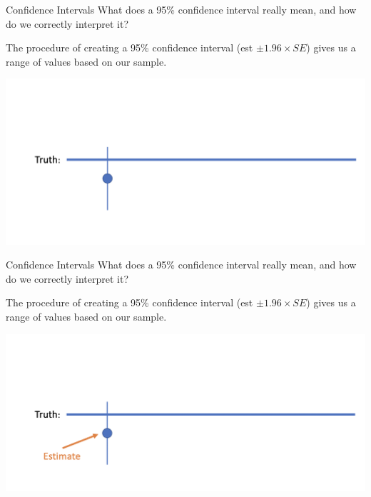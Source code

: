 \documentclass[10pt,t]{beamer}
\begin{document}
\begin{frame}{Confidence Intervals}
What does a 95\% confidence interval really mean, and how do we correctly interpret it?

\vspace{0.3cm}

The procedure of creating a 95\% confidence interval (est $\pm 1.96 \times SE$) gives us a range of values based on our sample.

\centering \includegraphics[scale=0.4]{ci1.png}

\end{frame}

\begin{frame}{Confidence Intervals}
What does a 95\% confidence interval really mean, and how do we correctly interpret it?

\vspace{0.3cm}

The procedure of creating a 95\% confidence interval (est $\pm 1.96 \times SE$) gives us a range of values based on our sample.

\centering \includegraphics[scale=0.4]{ci2.png}

\end{frame}
\end{document}
